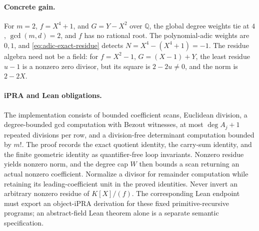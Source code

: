 \paragraph{Concrete gain.}
For \(m=2\), \(f=X^4+1\), and \(G=Y-X^2\) over \(\mathbb Q\),
the global degree weights tie at \(4\), \(\gcd(m,d)=2\), and
\(f\) has no rational root.  The polynomial-adic weights are \(0,1\),
and \eqref{eq:adic-exact-residue} detects
\(N=X^4-(X^4+1)=-1\).
The residue algebra need not be a field: for \(f=X^2-1\),
\(G=(X-1)+Y\), the least residue \(u-1\) is a nonzero zero divisor,
but its square is \(2-2u\ne0\), and the norm is \(2-2X\).

\paragraph{iPRA and Lean obligations.}
The implementation consists of bounded coefficient scans, Euclidean
division, a degree-bounded gcd computation with Bezout witnesses,
at most \(\deg A_j+1\) repeated divisions per row, and a
division-free determinant computation bounded by \(m!\).
The proof records the exact quotient identity, the carry-sum identity,
and the finite geometric identity as quantifier-free loop invariants.
Nonzero residue yields nonzero norm, and the degree cap \(W\) then
bounds a scan returning an actual nonzero coefficient.  Normalize a
divisor for remainder computation while retaining its leading-coefficient
unit in the proved identities.  Never invert an arbitrary nonzero residue
of \(K[X]/(f)\).  The corresponding Lean endpoint must export an
object-iPRA derivation for these fixed primitive-recursive programs;
an abstract-field Lean theorem alone is a separate semantic specification.
